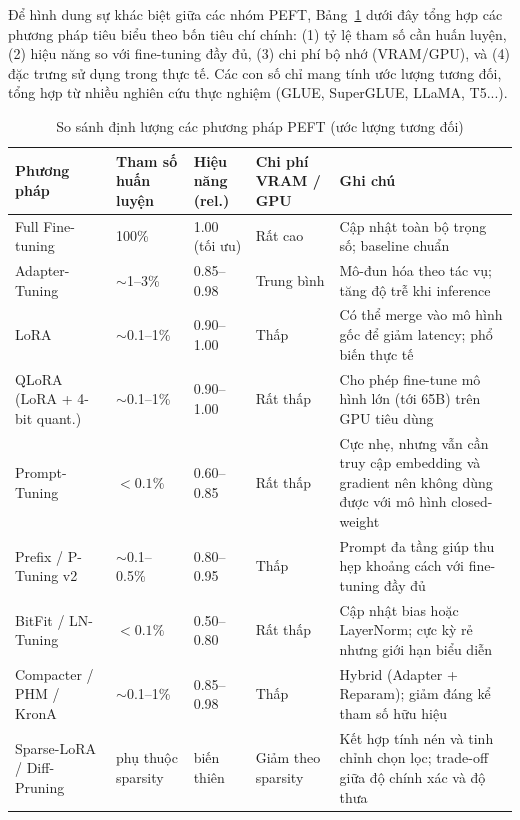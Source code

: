 Để hình dung sự khác biệt giữa các nhóm PEFT, Bảng~\ref{tab:peft_compare} dưới đây tổng hợp các phương pháp tiêu biểu theo bốn tiêu chí chính:  
(1) tỷ lệ tham số cần huấn luyện,  
(2) hiệu năng so với fine-tuning đầy đủ,  
(3) chi phí bộ nhớ (VRAM/GPU), và  
(4) đặc trưng sử dụng trong thực tế.  
Các con số chỉ mang tính ước lượng tương đối, tổng hợp từ nhiều nghiên cứu thực nghiệm (GLUE, SuperGLUE, LLaMA, T5...)\cite{houlsby2019parameter, hu2021lora, dettmers2023qlora, lester2021power, zaken2021bitfit}.

\begin{table}[H]
	\centering
	\caption{So sánh định lượng các phương pháp PEFT (ước lượng tương đối)}
	\label{tab:peft_compare}
	\begin{tabularx}{\textwidth}{|p{2.8cm}|p{1.8cm}|p{2cm}|p{2.2cm}|X|}
		\hline
		\textbf{Phương pháp} & \textbf{Tham số huấn luyện} & \textbf{Hiệu năng (rel.)} & \textbf{Chi phí VRAM / GPU} & \textbf{Ghi chú} \\ \hline
		Full Fine-tuning & 100\% & 1.00 (tối ưu) & Rất cao & Cập nhật toàn bộ trọng số; baseline chuẩn \\ \hline
		Adapter-Tuning & $\sim$1--3\% & 0.85--0.98 & Trung bình & Mô-đun hóa theo tác vụ; tăng độ trễ khi inference \\ \hline
		LoRA & $\sim$0.1--1\% & 0.90--1.00 & Thấp & Có thể merge vào mô hình gốc để giảm latency; phổ biến thực tế \\ \hline
		QLoRA (LoRA + 4-bit quant.) & $\sim$0.1--1\% & 0.90--1.00 & Rất thấp & Cho phép fine-tune mô hình lớn (tới 65B) trên GPU tiêu dùng \\ \hline
		Prompt-Tuning & $<0.1\%$ & 0.60--0.85 & Rất thấp & Cực nhẹ, nhưng vẫn cần truy cập embedding và gradient nên không dùng được với mô hình closed-weight \\ \hline
		Prefix / P-Tuning v2 & $\sim$0.1--0.5\% & 0.80--0.95 & Thấp & Prompt đa tầng giúp thu hẹp khoảng cách với fine-tuning đầy đủ \\ \hline
		BitFit / LN-Tuning & $<0.1\%$ & 0.50--0.80 & Rất thấp & Cập nhật bias hoặc LayerNorm; cực kỳ rẻ nhưng giới hạn biểu diễn \\ \hline
		Compacter / PHM / KronA & $\sim$0.1--1\% & 0.85--0.98 & Thấp & Hybrid (Adapter + Reparam); giảm đáng kể tham số hữu hiệu \\ \hline
		Sparse-LoRA / Diff-Pruning & phụ thuộc sparsity & biến thiên & Giảm theo sparsity & Kết hợp tính nén và tinh chỉnh chọn lọc; trade-off giữa độ chính xác và độ thưa \\ \hline
	\end{tabularx}
\end{table}

